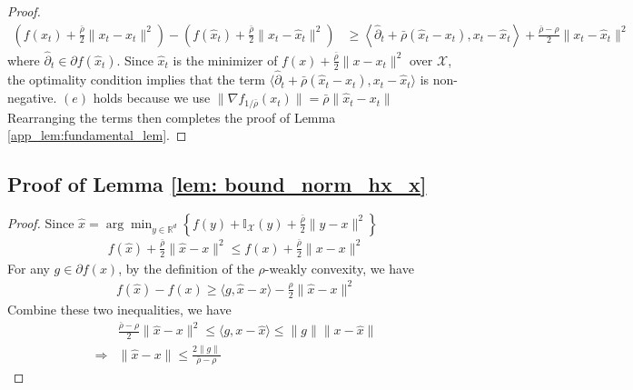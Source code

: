 \documentclass{article}
\def \X {\mathcal{X}}
\def \R {\mathbb{R}}
\def \brho {\bar{\rho}}
\def \hx {\hat{x}}
\begin{document}
\begin{proof}
    \begin{align}
        \left(f(x_t)+\frac{\brho}{2}\|x_t-x_t\|^2\right)-\left(f(\hx_t)+\frac{\brho}{2}\|x_t-\hx_t\|^2\right)&\geq \left\langle \hat{\partial}_t + \brho(\hx_t-x_t), x_t-\hx_t\right\rangle+\frac{\brho-\rho}{2}\|x_t-\hx_t\|^2
    \end{align}
    where $\hat{\partial}_t\in\partial f(\hx_t)$. Since $\hx_t$ is the minimizer of $f(x) + \frac{\brho}{2}\|x-x_t\|^2$ over $\X$, the optimality condition implies that the term $\langle \hat{\partial}_t + \brho(\hx_t-x_t), x_t-\hx_t\rangle$ is non-negative. $(e)$ holds because we use $\|\nabla f_{1/\brho}(x_t)\| = \brho\|\hx_t-x_t\|$ Rearranging the terms then completes the proof of Lemma \ref{app_lem:fundamental_lem}.
\end{proof}

\subsection{Proof of Lemma \ref{lem: bound_norm_hx_x}}
\begin{proof}
    Since $\hx = \arg\min_{y\in\R^d}\left\{f(y)+\mathbb{I}_\X(y)+\frac{\brho}{2}\|y-x\|^2\right\}$
    \begin{align}
        f(\hx) + \frac{\brho}{2}\|\hx-x\|^2 \leq f(x) + \frac{\brho}{2}\|x-x\|^2 
    \end{align}
    For any $g\in\partial f(x)$, by the definition of the $\rho$-weakly convexity, we have
    \begin{align}
        f(\hx)-f(x)\geq \langle g, \hx-x\rangle - \frac{\rho}{2}\|\hx-x\|^2
    \end{align}
    Combine these two inequalities, we have
    \begin{align}
        &\frac{\brho-\rho}{2}\|\hx-x\|^2\leq \langle g, x-\hx\rangle\leq \|g\|\|x-\hx\|\nonumber\\
        \Longrightarrow& \|\hx-x\|\leq \frac{2\|g\|}{\brho-\rho}
    \end{align}
\end{proof}
\end{document}

